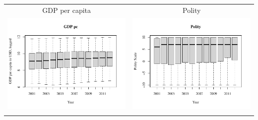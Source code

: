 \documentclass[reqno,onecolumn,letterpaper,12pt]{article}
\begin{document}
\begin{longtable}{c@{\hskip -.8cm}c}
GDP per capita & Polity\\
\includegraphics[height=.17\textheight, clip=true, trim=0cm 1cm 0cm 2cm]{SI_figures/descriptive_plots/GDPpc_boxplot.pdf}    &
\includegraphics[height=.17\textheight, clip=true, trim=0cm 1cm 0cm 2cm]{SI_figures/descriptive_plots/polity_boxplot.pdf}  \\

\clearpage


\end{longtable}
\end{document}

